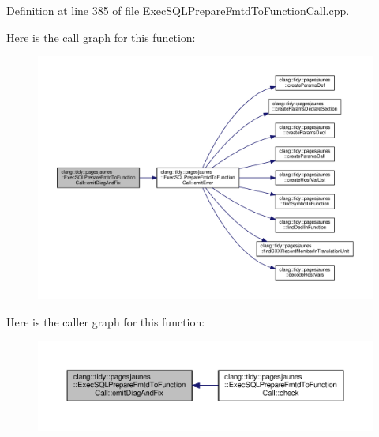 Definition at line 385 of file Exec\+S\+Q\+L\+Prepare\+Fmtd\+To\+Function\+Call.\+cpp.

Here is the call graph for this function\+:
\nopagebreak
\begin{figure}[H]
\begin{center}
\leavevmode
\includegraphics[width=350pt]{classclang_1_1tidy_1_1pagesjaunes_1_1_exec_s_q_l_prepare_fmtd_to_function_call_a384f21a310396151c6f01d282e0e484a_cgraph}
\end{center}
\end{figure}
Here is the caller graph for this function\+:
\nopagebreak
\begin{figure}[H]
\begin{center}
\leavevmode
\includegraphics[width=350pt]{classclang_1_1tidy_1_1pagesjaunes_1_1_exec_s_q_l_prepare_fmtd_to_function_call_a384f21a310396151c6f01d282e0e484a_icgraph}
\end{center}
\end{figure}
\mbox{\label{classclang_1_1tidy_1_1pagesjaunes_1_1_exec_s_q_l_prepare_fmtd_to_function_call_af3eaf79180a774629667e46f74960c7f}} 
